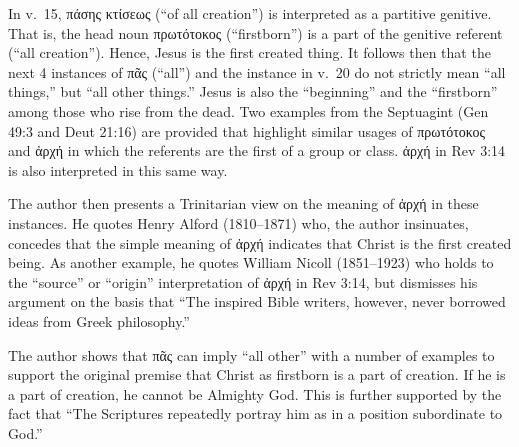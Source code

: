 In v.\ 15, πάσης κτίσεως (``of all creation'') is interpreted as a partitive genitive. That is, the head noun πρωτότοκος (``firstborn'') is a part of the genitive referent (``all creation''). Hence, Jesus is the first created thing. It follows then that the next 4 instances of πᾶς (``all'') and the instance in v.\ 20 do not strictly mean ``all things,'' but ``all other things.'' Jesus is also the ``beginning'' and the ``firstborn'' among those who rise from the dead. Two examples from the Septuagint (Gen 49:3 and Deut 21:16) are provided that highlight similar usages of πρωτότοκος and ἀρχή in which the referents are the first of a group or class. ἀρχή in Rev 3:14 is also interpreted in this same way.

The author then presents a Trinitarian view on the meaning of ἀρχή in these instances. He quotes Henry Alford (1810--1871) who, the author insinuates, concedes that the simple meaning of ἀρχή indicates that Christ is the first created being.\autocite{alfordgreektestament} As another example, he quotes William Nicoll (1851--1923) who holds to the ``source'' or ``origin'' interpretation of ἀρχή in Rev 3:14, but dismisses his argument on the basis that ``The inspired Bible writers, however, never borrowed ideas from Greek philosophy.''

The author shows that πᾶς can imply ``all other'' with a number of examples to support the original premise that Christ as firstborn is a part of creation. If he is a part of creation, he cannot be Almighty God. This is further supported by the fact that ``The Scriptures repeatedly portray him as in a position subordinate to God.''